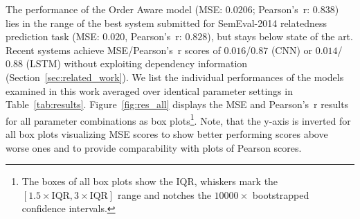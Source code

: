 The performance of the Order Aware model (MSE: $0.0206$; Pearson's~r: $0.838$) lies in the range of the best system submitted for SemEval-2014 relatedness prediction task (MSE: $0.020$, Pearson's~r: $0.828$), but stays below state of the art. Recent systems achieve MSE/Pearson's~r scores of $0.016$/$0.87$ \autocite{he_multi-perspective_2015}(CNN) or $0.014$/$0.88$ \autocite{mueller_siamese_2016}(LSTM) without exploiting dependency information (Section~\ref{sec:related_work}). We list the individual performances of the models examined in this work averaged over identical parameter settings in Table~\ref{tab:results}. Figure~\ref{fig:res_all} displays the \ac{MSE} and Pearson's~r results for all parameter combinations as box plots\footnote{The boxes of all box plots show the \ac{IQR}, whiskers mark the $[1.5\times \text{IQR}, 3\times \text{IQR}]$ range and notches the  $10000\times$ bootstrapped confidence intervals.}. Note, that the y-axis is inverted for all box plots visualizing \ac{MSE} scores to show better performing scores above worse ones and to provide comparability with plots of Pearson scores. 




